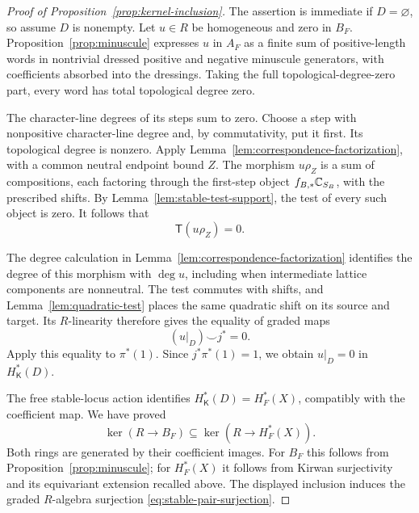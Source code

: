 \begin{proof}[Proof of Proposition~\ref{prop:kernel-inclusion}]
The assertion is immediate if $D=\varnothing$, so assume $D$ is
nonempty.  Let $u\in R$ be homogeneous and zero in $B_F$.
Proposition~\ref{prop:minuscule} expresses $u$ in $A_F$ as a finite sum
of positive-length words in nontrivial dressed positive and negative
minuscule generators, with coefficients absorbed into the dressings.
Taking the full topological-degree-zero part, every word has total
topological degree zero.

The character-line degrees of its steps sum to zero.  Choose a step
with nonpositive character-line degree and, by commutativity, put it
first.  Its topological degree is nonzero.  Apply
Lemma~\ref{lem:correspondence-factorization}, with a common neutral
endpoint bound $Z$.  The morphism $u\rho_Z$ is a sum of compositions,
each factoring through the first-step object
$f_{B,*}\mathbb C_{S_B}$, with the prescribed shifts.  By
Lemma~\ref{lem:stable-test-support}, the test of every such object is
zero.  It follows that
\[
 \mathsf T(u\rho_Z)=0.
\]

The degree calculation in
Lemma~\ref{lem:correspondence-factorization} identifies the degree of
this morphism with $\deg u$, including when intermediate lattice
components are nonneutral.  The test commutes with shifts, and
Lemma~\ref{lem:quadratic-test} places the same quadratic shift on its
source and target.  Its $R$-linearity therefore gives the equality of
graded maps
\[
 (u|_D)\smile j^*=0.
\]
Apply this equality to $\pi^*(1)$.  Since $j^*\pi^*(1)=1$, we obtain
$u|_D=0$ in $H_{\mathsf K}^*(D)$.

The free stable-locus action identifies
$H_{\mathsf K}^*(D)=H_F^*(X)$, compatibly with the coefficient map.
We have proved
\[
 \ker(R\to B_F)\subseteq\ker(R\to H_F^*(X)).
\]
Both rings are generated by their coefficient images.  For $B_F$ this
follows from Proposition~\ref{prop:minuscule}; for $H_F^*(X)$ it follows
from Kirwan surjectivity \cite{MN18} and its equivariant extension
recalled above.  The displayed inclusion induces the graded $R$-algebra
surjection
\eqref{eq:stable-pair-surjection}.
\end{proof}
